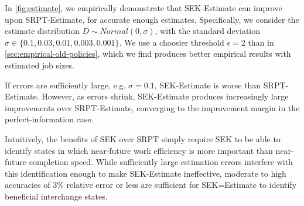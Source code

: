 \documentclass[acmsmall]{acmart}
\begin{document}
In \cref{fig:estimate}, we empirically demonstrate that SEK-Estimate can improve upon SRPT-Estimate,
for accurate enough estimates.
Specifically, we consider the estimate distribution $D \sim Normal(0, \sigma)$,
with the standard deviation $\sigma \in \{0.1, 0.03, 0.01, 0.003, 0.001\}$.
We use a choosier threshold $\epsilon=2$ than in \cref{sec:empirical-old-policies},
which we find produces better empirical results with estimated job sizes.

If errors are sufficiently large, e.g. $\sigma=0.1$, SEK-Estimate is worse than SRPT-Estimate.
However, as errors shrink, SEK-Estimate produces increasingly large improvements over SRPT-Estimate,
converging to the improvement margin in the perfect-information case.

Intuitively, the benefits of SEK over SRPT simply require SEK to be able to identify states in which near-future work efficiency is more important
than near-future completion speed. While sufficiently large estimation errors interfere with this identification
enough to make SEK-Estimate ineffective,
moderate to high accuracies of 3\% relative error or less are sufficient for SEK=Estimate to identify beneficial interchange states.




\end{document}
